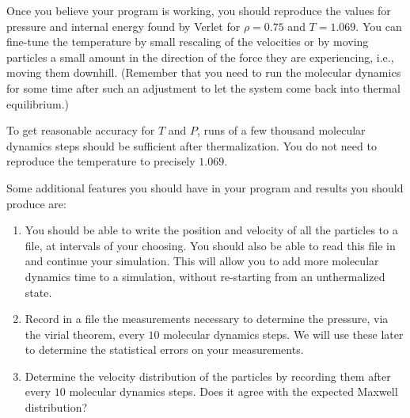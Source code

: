 Once you believe your program is working, you should reproduce the values for pressure and
internal energy found by Verlet for $\rho = 0.75$ and $T = 1.069$. You can fine-tune the
temperature by small rescaling of the velocities or by moving particles a small amount in
the direction of the force they are experiencing, i.e., moving them downhill. (Remember that
you need to run the molecular dynamics for some time after such an adjustment to let the
system come back into thermal equilibrium.)

To get reasonable accuracy for $T$ and $P$, runs of a few thousand molecular dynamics steps
should be sufficient after thermalization. You do not need to reproduce the temperature to
precisely $1.069$.

Some additional features you should have in your program and results you should produce are:

\begin{enumerate}
    \item You should be able to write the position and velocity of all the particles to a
          file, at intervals of your choosing. You should also be able to read this file in
          and continue your simulation. This will allow you to add more molecular dynamics
          time to a simulation, without re-starting from an unthermalized state.
    \item Record in a file the measurements necessary to determine the pressure, via the
          virial theorem, every $10$ molecular dynamics steps. We will use these later to
          determine the statistical errors on your measurements.
    \item Determine the velocity distribution of the particles by recording them after every
          $10$ molecular dynamics steps. Does it agree with the expected Maxwell distribution?
\end{enumerate}
